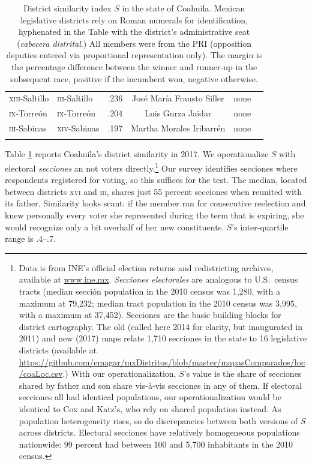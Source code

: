 \documentclass[letter,12pt]{article}
\begin{document}
\begin{table}
{\begin{tabular}{llrccc}
 \textsc{xiii}-Saltillo     & \textsc{iii}-Saltillo       &  .236 & José María Frausto Siller   & none            & \\ 
 \textsc{ix}-Torreón        & \textsc{ix}-Torreón         &  .204 & Luis Gurza Jaidar           & none            & \\ 
 \textsc{iii}-Sabinas       & \textsc{xiv}-Sabinas        &  .197 & Martha Morales Iribarrén    & none            & \\ 
 \\ [-1.2ex] \hline
\end{tabular}
}
\caption{District similarity index $S$ in the state of Coahuila. Mexican legislative districts rely on Roman numerals for identification, hyphenated in the Table with the district's administrative seat (\emph{cabecera distrital}.) All members were from the PRI (opposition deputies entered via proportional representation only). The margin is the percentage difference between the winner and runner-up in the subsequent race, positive if the incumbent won, negative otherwise.}\label{T:dsi}
\end{table}

Table \ref{T:dsi} reports Coahuila's district similarity in 2017. We operationalize $S$ with electoral \emph{secciones} an not voters directly.\footnote{Data is from INE's official election returns and redistricting archives, available at \url{www.ine.mx}. \emph{Secciones electorales} are analogous to U.S.\ census tracts (median secci\'on population in the 2010 census was 1,280, with a maximum at 79,232; median tract population in the 2010 census was 3,995, with a maximum at 37,452). Secciones are the basic building blocks for district cartography. The old (called here 2014 for clarity, but inaugurated in 2011) and new (2017) maps relate 1,710 secciones in the state to 16 legislative districts (available at \url{https://github.com/emagar/mxDistritos/blob/master/mapasComparados/loc/coaLoc.csv}.) With our operationalization, $S$'s value is the share of secciones shared by father and son share vis-à-vis secciones in any of them. If electoral secciones all had identical populations, our operationalization would be identical to Cox and Katz's, who rely on shared population instead. As population heterogeneity rises, so do discrepancies between both versions of $S$ across districts. Electoral secciones have relatively homogeneous populations nationwide: 99 percent had between 100 and 5,700 inhabitants in the 2010 census.} Our survey identifies secciones where respondents registered for voting, so this suffices for the test. The median, located between districts \textsc{xvi} and \textsc{iii}, shares just 55 percent secciones when reunited with its father. Similarity looks scant: if the member ran for consecutive reelection and knew personally every voter she represented during the term that is expiring, she would recognize only a bit overhalf of her new constituents. $S$'s inter-quartile range is .4--.7.
\end{document}
